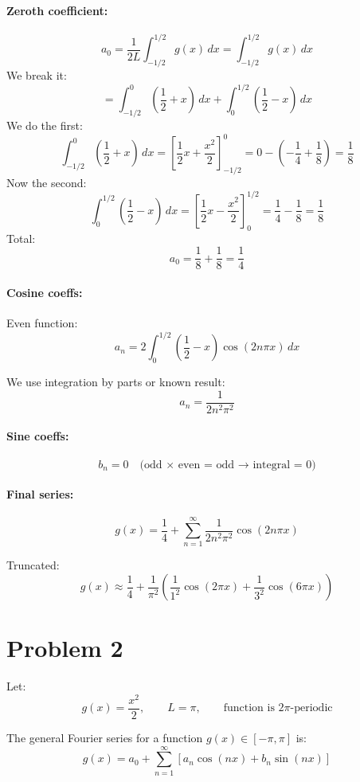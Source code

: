 \documentclass{article}
\begin{document}
\paragraph{Zeroth coefficient:}
\[
a_0 = \frac{1}{2L} \int_{-1/2}^{1/2} g(x)\,dx = \int_{-1/2}^{1/2} g(x)\,dx
\]
We break it:
\[
= \int_{-1/2}^{0} \left( \frac{1}{2} + x \right)\,dx + \int_0^{1/2} \left( \frac{1}{2} - x \right)\,dx
\]
We do the first:
\[
\int_{-1/2}^{0} \left( \frac{1}{2} + x \right)\,dx = \left[ \frac{1}{2}x + \frac{x^2}{2} \right]_{-1/2}^{0}
= 0 - \left( -\frac{1}{4} + \frac{1}{8} \right) = \frac{1}{8}
\]
Now the second:
\[
\int_0^{1/2} \left( \frac{1}{2} - x \right)\,dx = \left[ \frac{1}{2}x - \frac{x^2}{2} \right]_0^{1/2}
= \frac{1}{4} - \frac{1}{8} = \frac{1}{8}
\]
Total:
\[
a_0 = \frac{1}{8} + \frac{1}{8} = \frac{1}{4}
\]

\paragraph{Cosine coeffs:}
Even function:
\[
a_n = 2 \int_0^{1/2} \left( \frac{1}{2} - x \right) \cos(2n\pi x)\,dx
\]

We use integration by parts or known result:
\[
a_n = \frac{1}{2n^2\pi^2}
\]

\paragraph{Sine coeffs:}
\[
b_n = 0 \quad \text{(odd × even = odd → integral = 0)}
\]

\paragraph{Final series:}
\[
g(x) = \frac{1}{4} + \sum_{n=1}^\infty \frac{1}{2n^2\pi^2} \cos(2n\pi x)
\]

Truncated:
\[
g(x) \approx \frac{1}{4} + \frac{1}{\pi^2} \left( \frac{1}{1^2} \cos(2\pi x) + \frac{1}{3^2} \cos(6\pi x) \right)
\]

\newpage
\section*{Problem 2}

Let:
\[
g(x) = \frac{x^2}{2}, \qquad L = \pi, \qquad \text{function is } 2\pi\text{-periodic}
\]

The general Fourier series for a function \( g(x) \in [-\pi, \pi] \) is:
\[
g(x) = a_0 + \sum_{n=1}^{\infty} \left[ a_n \cos(nx) + b_n \sin(nx) \right]
\]
\end{document}
